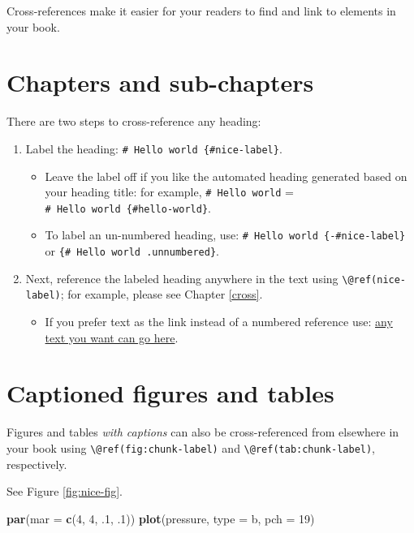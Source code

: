 \documentclass[
]{book}
\newenvironment{Shaded}{\begin{snugshade}}{\end{snugshade}}
\newcommand{\AttributeTok}[1]{\textcolor[rgb]{0.13,0.29,0.53}{#1}}
\newcommand{\DecValTok}[1]{\textcolor[rgb]{0.00,0.00,0.81}{#1}}
\newcommand{\FunctionTok}[1]{\textcolor[rgb]{0.13,0.29,0.53}{\textbf{#1}}}
\newcommand{\NormalTok}[1]{#1}
\newcommand{\StringTok}[1]{\textcolor[rgb]{0.31,0.60,0.02}{#1}}
\providecommand{\tightlist}{%
  \setlength{\itemsep}{0pt}\setlength{\parskip}{0pt}}
\theoremstyle{definition}
\theoremstyle{definition}
\theoremstyle{definition}
\theoremstyle{definition}
\theoremstyle{remark}
\begin{document}
Cross-references make it easier for your readers to find and link to elements in your book.

\section{Chapters and sub-chapters}\label{chapters-and-sub-chapters}

There are two steps to cross-reference any heading:

\begin{enumerate}
\def\labelenumi{\arabic{enumi}.}
\tightlist
\item
  Label the heading: \texttt{\#\ Hello\ world\ \{\#nice-label\}}.

  \begin{itemize}
  \tightlist
  \item
    Leave the label off if you like the automated heading generated based on your heading title: for example, \texttt{\#\ Hello\ world} = \texttt{\#\ Hello\ world\ \{\#hello-world\}}.
  \item
    To label an un-numbered heading, use: \texttt{\#\ Hello\ world\ \{-\#nice-label\}} or \texttt{\{\#\ Hello\ world\ .unnumbered\}}.
  \end{itemize}
\item
  Next, reference the labeled heading anywhere in the text using \texttt{\textbackslash{}@ref(nice-label)}; for example, please see Chapter \ref{cross}.

  \begin{itemize}
  \tightlist
  \item
    If you prefer text as the link instead of a numbered reference use: \hyperref[cross]{any text you want can go here}.
  \end{itemize}
\end{enumerate}

\section{Captioned figures and tables}\label{captioned-figures-and-tables}

Figures and tables \emph{with captions} can also be cross-referenced from elsewhere in your book using \texttt{\textbackslash{}@ref(fig:chunk-label)} and \texttt{\textbackslash{}@ref(tab:chunk-label)}, respectively.

See Figure \ref{fig:nice-fig}.

\begin{Shaded}
\begin{Highlighting}[]
\FunctionTok{par}\NormalTok{(}\AttributeTok{mar =} \FunctionTok{c}\NormalTok{(}\DecValTok{4}\NormalTok{, }\DecValTok{4}\NormalTok{, .}\DecValTok{1}\NormalTok{, .}\DecValTok{1}\NormalTok{))}
\FunctionTok{plot}\NormalTok{(pressure, }\AttributeTok{type =} \StringTok{\textquotesingle{}b\textquotesingle{}}\NormalTok{, }\AttributeTok{pch =} \DecValTok{19}\NormalTok{)}
\end{Highlighting}
\end{Shaded}
\end{document}
